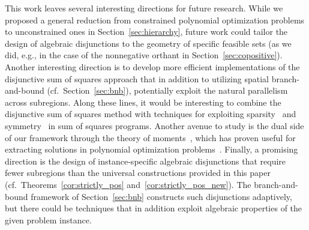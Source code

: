 \documentclass[12pt]{article}
\theoremstyle{remark}
\begin{document}
{
This work leaves several interesting directions for future research. While we proposed a general reduction from constrained polynomial optimization problems to unconstrained ones in Section~\ref{sec:hierarchy}, future work could tailor the design of algebraic disjunctions to the geometry of specific feasible sets (as we did, e.g., in the case of the nonnegative orthant in Section~\ref{sec:copositive}). 
Another interesting direction is to develop more efficient implementations of the disjunctive sum of squares approach that in addition to utilizing spatial {branch-and-bound} (cf.\ Section~\ref{sec:bnb}), potentially exploit the natural parallelism across subregions. 
Along these lines, it would be interesting to combine the disjunctive sum of squares method with techniques for exploiting sparsity~\cite{Waki2006, Zheng2022, Zheng2021} and symmetry~\cite{Gatermann2004, Riener2013} in sum of squares programs. Another avenue to study is the dual side of our framework through the theory of moments~\cite{lasserre2001global, Lasserre2019}, which has proven useful for extracting solutions in polynomial optimization problems~\cite{Henrion2005}.
Finally, a promising direction is the design of instance-specific algebraic disjunctions that require fewer subregions than the universal constructions provided in this paper (cf.\ Theorems~\ref{cor:strictly_pos} and~\ref{cor:strictly_pos_new}). The branch-and-bound framework of Section~\ref{sec:bnb} constructs such disjunctions adaptively, but there could be techniques that in addition exploit algebraic properties of the given problem instance.}
\end{document}
